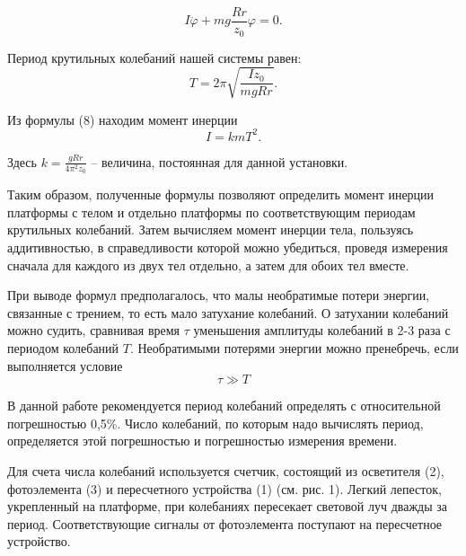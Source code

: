 \begin{equation}
    I\ddot{\varphi} + mg \frac{Rr}{z_0}\varphi = 0.
\end{equation}

Период крутильных колебаний нашей системы равен:
\begin{equation}
    T = 2\pi \sqrt{\frac{Iz_0}{mgRr}}.
\end{equation}

Из формулы (8) находим момент инерции
\begin{equation}
    I = kmT^2.
\end{equation}

Здесь $k =\frac{gRr}{4\pi^2z_0}$ -- величина, постоянная для данной
установки.

Таким образом, полученные формулы позволяют определить момент инерции платформы с телом и отдельно платформы по соответствующим периодам крутильных колебаний. Затем вычисляем момент инерции тела, пользуясь аддитивностью, в справедливости которой можно убедиться, проведя измерения сначала для каждого из двух тел отдельно, а затем для обоих тел вместе.

При выводе формул предполагалось, что малы необратимые потери энергии, связанные с трением, то есть мало затухание колебаний. О затухании колебаний можно судить, сравнивая время $\tau$ уменьшения амплитуды колебаний в 2-3 раза с периодом колебаний $T$. Необратимыми потерями энергии можно пренебречь, если выполняется условие
\begin{equation}
    \tau \gg T
\end{equation}

В данной работе рекомендуется период колебаний определять с относительной погрешностью 0,5\%. Число колебаний, по которым надо вычислять период, определяется этой погрешностью и погрешностью измерения времени.

Для счета числа колебаний используется счетчик, состоящий из осветителя (2), фотоэлемента (3) и пересчетного устройства (1) (см. рис. 1). Легкий лепесток, укрепленный на платформе, при колебаниях пересекает световой луч дважды за период. Соответствующие сигналы от фотоэлемента поступают на пересчетное устройство.
